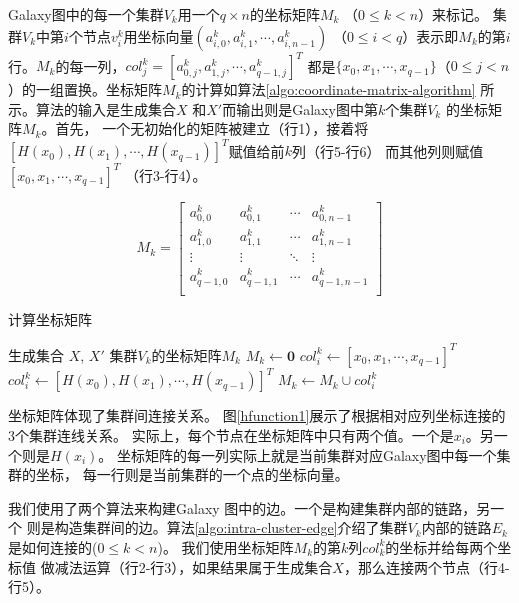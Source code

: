 Galaxy图中的每一个集群$V_k$用一个$q\times n$的坐标矩阵$M_k$ （$0 \le k < n$）来标记。
集群$V_k$中第$i$个节点$v_{i}^{k}$用坐标向量$(a_{i,0}^{k}, a_{i,1}^{k},\cdots, a_{i,n-1}^{k})$
（$0 \le i < q$）表示即$M_k$的第$i$行。$M_k$的每一列，$col_j^k=[a_{0,j}^k, a_{1,j}^k, \cdots, a_{q-1,j}^k]^T$
都是$\{x_{0}, x_{1}, \cdots, x_{q-1}\}$（$0 \le j < n$）的一组置换。坐标矩阵$M_k$的计算如算法\ref{algo:coordinate-matrix-algorithm}
所示。算法的输入是生成集合$X$ 和$X'$而输出则是Galaxy图中第$k$个集群$V_k$ 的坐标矩阵$M_k$。首先，
一个无初始化的矩阵被建立（行1），接着将
$[H(x_{0}),H( x_{1}), \cdots, H(x_{q-1})]^T$赋值给前$k$列（行5-行6）
而其他列则赋值$[x_{0}, x_{1}, \cdots, x_{q-1}]^T$
（行3-行4）。

\begin{equation*}
M_k =
\begin{bmatrix}
a_{0,0}^{k} & a_{0,1}^{k} & \cdots & a_{0,n-1}^{k} \\
a_{1,0}^{k} & a_{1,1}^{k} & \cdots & a_{1,n-1}^{k} \\
\vdots & \vdots & \ddots & \vdots \\
a_{q-1,0}^{k} & a_{q-1,1}^{k} & \cdots & a_{q-1,n-1}^{k} \\
\end{bmatrix}
\end{equation*}

\begin{algorithm}[t]
 \centering
  \caption{计算坐标矩阵}
  \label{algo:coordinate-matrix-algorithm}
  \begin{algorithmic}[1]
  \REQUIRE 生成集合 $X$, $X'$
  \ENSURE 集群$V_k$的坐标矩阵$M_k$
  \STATE $M_k \leftarrow \textbf{0}$
      \STATE $col_i^k \leftarrow [x_{0}, x_{1}, \cdots, x_{q-1}]^T$
    \ELSE
      \STATE \textbf{$col_i^k \leftarrow [H(x_{0}),H( x_{1}), \cdots, H(x_{q-1})]^T$}
    \ENDIF
    \STATE $M_k \leftarrow M_k \cup col_i^k$
  \ENDFOR
  \end{algorithmic}
\end{algorithm}



坐标矩阵体现了集群间连接关系。
图\ref{hfunction1}展示了根据相对应列坐标连接的3个集群连线关系。
实际上，每个节点在坐标矩阵中只有两个值。一个是$x_i$。另一个则是$H(x_i)$。
坐标矩阵的每一列实际上就是当前集群对应Galaxy图中每一个集群的坐标，
每一行则是当前集群的一个点的坐标向量。

我们使用了两个算法来构建Galaxy 图中的边。一个是构建集群内部的链路，另一个
则是构造集群间的边。算法\ref{algo:intra-cluster-edge}介绍了集群$V_k$内部的链路$E_k$
是如何连接的($0 \le k < n$)。 我们使用坐标矩阵$M_k$的第$k$列$col_k^k$的坐标并给每两个坐标值
做减法运算（行2-行3），如果结果属于生成集合$X$，那么连接两个节点（行4-行5）。

